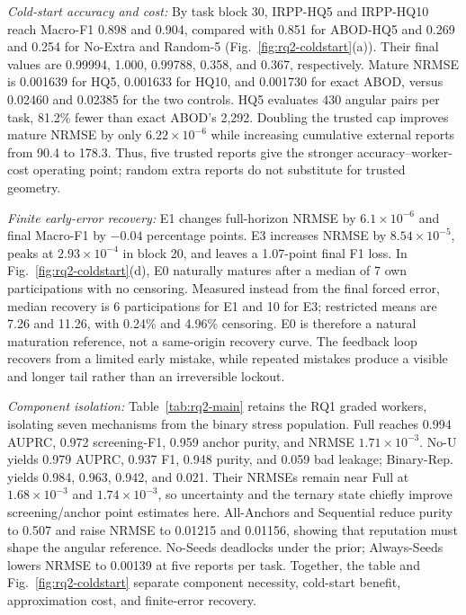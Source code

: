 \documentclass[journal]{IEEEtran}
\begin{document}
\textit{Cold-start accuracy and cost:}
By task block 30, IRPP-HQ5 and IRPP-HQ10 reach Macro-F1 0.898 and 0.904,
compared with 0.851 for ABOD-HQ5 and 0.269 and 0.254 for No-Extra and Random-5
(Fig.~\ref{fig:rq2-coldstart}(a)). Their final values are 0.99994, 1.000,
0.99788, 0.358, and 0.367, respectively. Mature NRMSE is 0.001639 for HQ5,
0.001633 for HQ10, and 0.001730 for exact ABOD, versus 0.02460 and 0.02385 for the
two controls. HQ5 evaluates 430 angular pairs per task, 81.2\% fewer than
exact ABOD's 2,292. Doubling the trusted cap improves mature NRMSE by only
$6.22\times10^{-6}$ while increasing cumulative external reports from 90.4 to
178.3. Thus, five trusted reports give the stronger accuracy--worker-cost
operating point; random extra reports do not substitute for trusted geometry.

\textit{Finite early-error recovery:}
E1 changes full-horizon NRMSE by $6.1\times10^{-6}$ and final Macro-F1 by
$-0.04$ percentage points. E3 increases NRMSE by $8.54\times10^{-5}$, peaks at
$2.93\times10^{-4}$ in block 20, and leaves a 1.07-point final F1 loss. In
Fig.~\ref{fig:rq2-coldstart}(d), E0 naturally matures after a median of 7 own
participations with no censoring. Measured instead from the final forced error,
median recovery is 6 participations for E1 and 10 for E3; restricted means are
7.26 and 11.26, with 0.24\% and 4.96\% censoring. E0 is therefore a natural
maturation reference, not a same-origin recovery curve. The feedback loop
recovers from a limited early mistake, while repeated mistakes produce a
visible and longer tail rather than an irreversible lockout.

\textit{Component isolation:}
Table~\ref{tab:rq2-main} retains the RQ1 graded workers, isolating seven
mechanisms from the binary stress population.
Full reaches 0.994 AUPRC, 0.972 screening-F1, 0.959 anchor purity, and NRMSE
$1.71\times10^{-3}$. No-U yields 0.979 AUPRC, 0.937 F1, 0.948 purity, and
0.059 bad leakage; Binary-Rep. yields 0.984, 0.963, 0.942, and 0.021.
Their NRMSEs remain near Full at $1.68\times10^{-3}$ and $1.74\times10^{-3}$,
so uncertainty and the ternary state
chiefly improve screening/anchor point estimates here. All-Anchors and
Sequential reduce purity to 0.507 and raise NRMSE to 0.01215 and 0.01156, showing
that reputation must shape the angular reference. No-Seeds deadlocks under the
prior; Always-Seeds lowers NRMSE to 0.00139 at five reports per task. Together,
the table and Fig.~\ref{fig:rq2-coldstart} separate component necessity,
cold-start benefit, approximation cost, and finite-error recovery.
\end{document}
